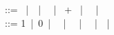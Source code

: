  ::= ~|~~|~ \times {}~|~ + ~|~ \rightarrow {}~|~\lceil {} \rceil \\
 ::= 1~|~0~|~ \otimes {}~|~ \oplus {}~|~ \multimap {}~|~\diamond{}~|~\lfloor {} \rfloor
